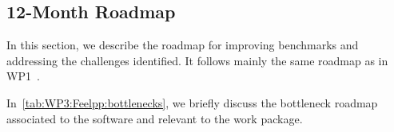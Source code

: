 \subsection{12-Month Roadmap}
\label{sec:WP3:Feelpp:roadmap}

In this section, we describe the roadmap for improving benchmarks and addressing the challenges identified. 
It follows mainly the same roadmap as in WP1~.

In~\cref{tab:WP3:Feelpp:bottlenecks}, we briefly discuss the bottleneck roadmap associated to the software and relevant to the work package.


